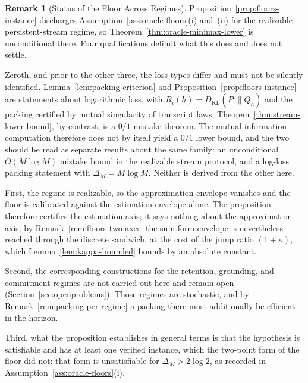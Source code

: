 \documentclass[12pt]{article}
\theoremstyle{definition}
\newtheorem{remark}[theorem]{Remark}
\newcommand{\KL}{D_{\mathrm{KL}}}
\begin{document}
\begin{remark}[Status of the Floor Across Regimes]
\label{rem:floors-status}
Proposition~\ref{prop:floors-instance} discharges
Assumption~\ref{ass:oracle-floors}(i) and~(ii) for the realizable
persistent-stream regime, so Theorem~\ref{thm:oracle-minimax-lower} is
unconditional there.  Four qualifications delimit what this does and does not
settle.

Zeroth, and prior to the other three, the loss types differ and must not be
silently identified.  Lemma~\ref{lem:packing-criterion} and
Proposition~\ref{prop:floors-instance} are statements about logarithmic loss,
with $R_i(h)=\KL(P^i\|Q_h)$ and the packing certified by mutual singularity of
transcript laws; Theorem~\ref{thm:stream-lower-bound}, by contrast, is a $0/1$
mistake theorem.  The mutual-information computation therefore does not by
itself yield a $0/1$ lower bound, and the two should be read as separate
results about the same family: an unconditional $\Theta(M\log M)$ mistake bound
in the realizable stream protocol, and a log-loss packing statement with
$\Delta_M=M\log M$.  Neither is derived from the other here.

First, the regime is realizable, so the approximation envelope vanishes and the
floor is calibrated against the estimation envelope alone.  The proposition
therefore certifies the estimation axis; it says nothing about the
approximation axis; by Remark~\ref{rem:floors-two-axes} the sum-form envelope
is nevertheless reached through the discrete sandwich, at the cost of the jump
ratio $(1+\kappa)$, which Lemma~\ref{lem:kappa-bounded} bounds by an absolute
constant.

Second, the corresponding constructions for the retention, grounding, and
commitment regimes are not carried out here and remain open
(Section~\ref{sec:openproblems}).  Those regimes are stochastic, and by
Remark~\ref{rem:packing-per-regime} a packing there must additionally be
efficient in the horizon.

Third, what the proposition establishes in general terms is that the hypothesis
is satisfiable and has at least one verified instance, which the two-point form
of the floor did not: that form is unsatisfiable for $\Delta_M>2\log2$, as
recorded in Assumption~\ref{ass:oracle-floors}(i).
\end{remark}
\end{document}

